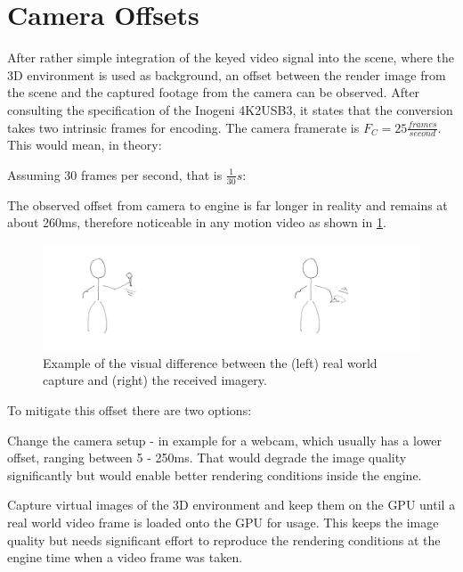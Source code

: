 %
\section{Camera Offsets}

After rather simple integration of the keyed video signal into the scene, where 
the 3D environment is used as background, an offset between the render image 
from the scene and the captured footage from the camera can be observed. After 
consulting the specification of the Inogeni 4K2USB3, it states that the 
conversion takes two intrinsic frames for encoding. The camera framerate 
is $F_C = 25 \frac{frames}{second}$. This would mean, in theory:


Assuming 30 frames per second, that is $\frac{1}{30}s$:



The observed offset from camera to engine is far longer in reality and remains 
at about 260ms, therefore noticeable in any motion video as shown in 
\ref{fig:offsets:example}.

\begin{figure}[htb]
	\includegraphics[width=\textwidth]{_raw_resources/offsets/motion-difference.png}
	\caption{Example of the visual difference between the (left) real world 
	capture and (right) the received imagery.}
	\label{fig:offsets:example}
\end{figure}


To mitigate this offset there are two options:

\begin{my_list}
	\item Change the camera setup - in example for a webcam, which usually has 
	a lower offset, ranging between 5 - 250ms. That would degrade the image 
	quality significantly but would enable better rendering conditions inside 
	the engine.
	\item Capture virtual images of the 3D environment and keep them on the GPU 
	until a real world video frame is loaded onto the GPU for usage. This keeps 
	the image quality but needs significant effort to reproduce the rendering 
	conditions at the engine time when a video frame was taken. 
\end{my_list}

